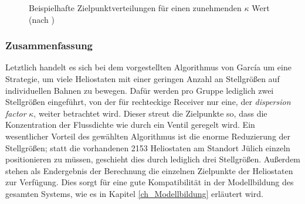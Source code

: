 \begin{figure}[h!]
    \centering
    \setlength{\fboxsep}{1pt}
    \setlength{\fboxrule}{1pt}
    \caption[Beispielhafte Zielpunktverteilungen für einen zunehmenden $\kappa$ Wert]{Beispielhafte Zielpunktverteilungen für einen zunehmenden $\kappa$ Wert (nach \mbox{\cite[S.11]{Garcia2}})}
    \label{fig_GarciaZielpunkte}
\end{figure}

\subsubsection*{Zusammenfassung} \label{subsubsec_Zusammenfassung}
Letztlich handelt es sich bei dem vorgestellten Algorithmus von García um eine Strategie, um viele Heliostaten mit einer geringen Anzahl an Stellgrößen auf individuellen Bahnen zu bewegen.
Dafür werden pro Gruppe lediglich zwei Stellgrößen eingeführt, von der für rechteckige Receiver nur eine, der \textit{dispersion factor} $\kappa$, weiter betrachtet wird.
Dieser streut die Zielpunkte so, dass die Konzentration der Flussdichte wie durch ein Ventil geregelt wird.
Ein wesentlicher Vorteil des gewählten Algorithmus ist die enorme Reduzierung der Stellgrößen; statt die vorhandenen 2153 Heliostaten am Standort Jülich einzeln positionieren zu müssen, geschieht dies durch lediglich drei Stellgrößen.
Außerdem stehen als Endergebnis der Berechnung die einzelnen Zielpunkte der Heliostaten zur Verfügung.
Dies sorgt für eine gute Kompatibilität in der Modellbildung des gesamten Systems, wie es in Kapitel \ref{ch_Modellbildung} erläutert wird.



